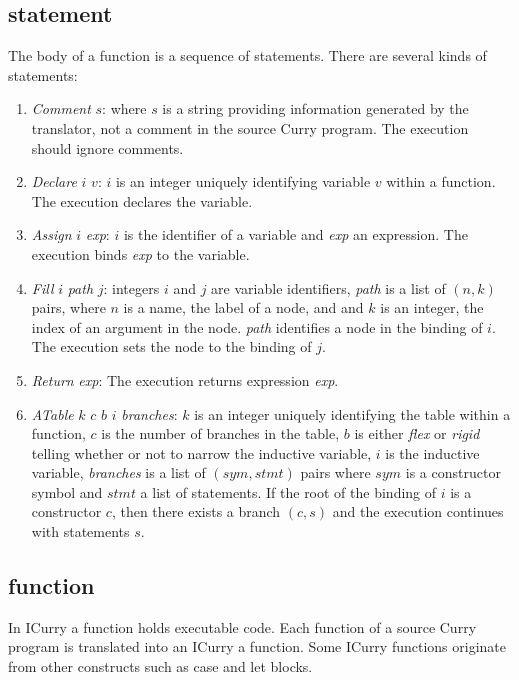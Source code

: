 \documentclass{article}
\begin{document}
\subsection{statement}
%

The body of a function is a sequence of statements.
There are several kinds of statements:
\begin{enumerate}
\itemsep=-4pt  
\item \emph{Comment} $s$: where $s$ is a string providing
  information generated by the translator,
  not a comment in the source Curry program.
  The execution should ignore comments.
\item \emph{Declare} $i$ $v$: $i$ is an integer uniquely identifying
  variable $v$ within a function. The execution declares the variable.
\item \emph{Assign} $i$ \emph{exp}: $i$ is the identifier of a variable
  and \emph{exp} an expression.  The execution binds \emph{exp} to
  the variable.
\item \emph{Fill} $i$ \emph{path} $j$: integers $i$ and $j$ are
  variable identifiers, \emph{path} is a list of $(n,k)$ pairs, where
  $n$ is a name, the label of a node, and and $k$ is an integer, the
  index of an argument in the node. \emph{path} identifies a node in
  the binding of $i$.  The execution sets the node to the binding of $j$.
\item \emph{Return} \emph{exp}: The execution returns expression \emph{exp}.
\item \emph{ATable} $k$ $c$ $b$ $i$ \emph{branches}:
  $k$ is an integer uniquely identifying the table within a function,
  $c$ is the number of branches in the table,
  $b$ is either \emph{flex} or \emph{rigid} telling whether or not
  to narrow the inductive variable,
  $i$ is the inductive variable,
  \emph{branches} is a list of $(sym,stmt)$ pairs where $sym$ is
  a constructor symbol and $stmt$ a list of statements.
  If the root of the binding of $i$ is a constructor $c$,
  then there exists a branch $(c,s)$ and the execution continues
  with statements $s$.
\end{enumerate}
%
\subsection{function}
%

In ICurry a function holds executable code.  Each function of a source
Curry program is translated into an ICurry a function.  Some ICurry
functions originate from other constructs such as case and let
blocks.
\end{document}
